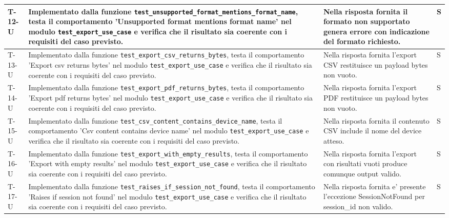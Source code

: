 \documentclass[a4paper,12pt]{article}
\begin{document}
{{\begin{longtable}{|>{\RaggedRight\arraybackslash}p{1.55cm}|>{\RaggedRight\arraybackslash}p{8.0cm}|>{\RaggedRight\arraybackslash}p{4.6cm}|>{\RaggedRight\arraybackslash}p{1.2cm}|}
        \hline
        T-12-U & Implementato dalla funzione \texttt{test\_\allowbreak unsupported\_\allowbreak format\_\allowbreak mentions\_\allowbreak format\_\allowbreak name}, testa il comportamento 'Unsupported format mentions format name' nel modulo \texttt{test\_\allowbreak export\_\allowbreak use\_\allowbreak case} e verifica che il risultato sia coerente con i requisiti del caso previsto. & Nella risposta fornita il formato non supportato genera errore con indicazione del formato richiesto. & S \\
        \hline
        T-13-U & Implementato dalla funzione \texttt{test\_\allowbreak export\_\allowbreak csv\_\allowbreak returns\_\allowbreak bytes}, testa il comportamento 'Export csv returns bytes' nel modulo \texttt{test\_\allowbreak export\_\allowbreak use\_\allowbreak case} e verifica che il risultato sia coerente con i requisiti del caso previsto. & Nella risposta fornita l'export CSV restituisce un payload bytes non vuoto. & S \\
        \hline
        T-14-U & Implementato dalla funzione \texttt{test\_\allowbreak export\_\allowbreak pdf\_\allowbreak returns\_\allowbreak bytes}, testa il comportamento 'Export pdf returns bytes' nel modulo \texttt{test\_\allowbreak export\_\allowbreak use\_\allowbreak case} e verifica che il risultato sia coerente con i requisiti del caso previsto. & Nella risposta fornita l'export PDF restituisce un payload bytes non vuoto. & S \\
        \hline
        T-15-U & Implementato dalla funzione \texttt{test\_\allowbreak csv\_\allowbreak content\_\allowbreak contains\_\allowbreak device\_\allowbreak name}, testa il comportamento 'Csv content contains device name' nel modulo \texttt{test\_\allowbreak export\_\allowbreak use\_\allowbreak case} e verifica che il risultato sia coerente con i requisiti del caso previsto. & Nella risposta fornita il contenuto CSV include il nome del device atteso. & S \\
        \hline
        T-16-U & Implementato dalla funzione \texttt{test\_\allowbreak export\_\allowbreak with\_\allowbreak empty\_\allowbreak results}, testa il comportamento 'Export with empty results' nel modulo \texttt{test\_\allowbreak export\_\allowbreak use\_\allowbreak case} e verifica che il risultato sia coerente con i requisiti del caso previsto. & Nella risposta fornita l'export con risultati vuoti produce comunque output valido. & S \\
        \hline
        T-17-U & Implementato dalla funzione \texttt{test\_\allowbreak raises\_\allowbreak if\_\allowbreak session\_\allowbreak not\_\allowbreak found}, testa il comportamento 'Raises if session not found' nel modulo \texttt{test\_\allowbreak export\_\allowbreak use\_\allowbreak case} e verifica che il risultato sia coerente con i requisiti del caso previsto. & Nella risposta fornita e' presente l'eccezione SessionNotFound per session\_id non valido. & S \\

\end{longtable}}}
\end{document}
